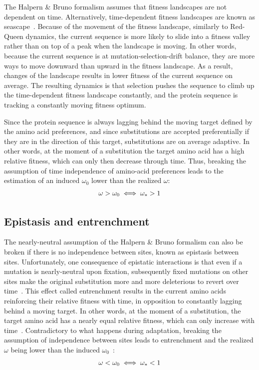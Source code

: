The Halpern \& Bruno formalism assumes that fitness landscapes are not dependent on time.
Alternatively, time-dependent fitness landscapes are known as seascape~\citep{Mustonen2009}.
Because of the movement of the fitness landscape, similarly to Red-Queen dynamics, the current sequence is more likely to slide into a fitness valley rather than on top of a peak when the landscape is moving.
In other words, because the current sequence is at mutation-selection-drift balance, they are more ways to move downward than upward in the fitness landscape.
As a result, changes of the landscape results in lower fitness of the current sequence on average.
The resulting dynamics is that selection pushes the sequence to climb up the time-dependent fitness landscape constantly, and the protein sequence is tracking a constantly moving fitness optimum.

Since the protein sequence is always lagging behind the moving target defined by the amino acid preferences, and since substitutions are accepted preferentially if they are in the direction of this target, substitutions are on average adaptive.
In other words, at the moment of a substitution the target amino acid has a high relative fitness, which can only then decrease through time.
Thus, breaking the assumption of time independence of amino-acid preferences leads to the estimation of an induced $\omega_0$ lower than the realized $\omega$:
\begin{equation}
    \omega > \omega_0 \\
    \iff \omega_* > 1
\end{equation}

\subsection{Epistasis and entrenchment}
\label{subsec:epistasis-and-entrenchment}

The nearly-neutral assumption of the Halpern \& Bruno formalism can also be broken if there is no independence between sites, known as epistasis between sites.
Unfortunately, one consequence of epistatic interactions is that even if a mutation is nearly-neutral upon fixation, subsequently fixed mutations on other sites make the original substitution more and more deleterious to revert over time~\citep{Gong2014, Lunzer2010, Mccandlish2013}.
This effect called entrenchment results in the current amino acids reinforcing their relative fitness with time, in opposition to constantly lagging behind a moving target.
In other words, at the moment of a substitution, the target amino acid has a nearly equal relative fitness, which can only increase with time~\citep{Goldstein2016, Goldstein2017}.
Contradictory to what happens during adaptation, breaking the assumption of independence between sites leads to entrenchment and the realized $\omega$ being lower than the induced $\omega_0$~\citep{Rodrigue2016}:
\begin{equation}
    \omega < \omega_0 \\
    \iff \omega_* < 1
\end{equation}


